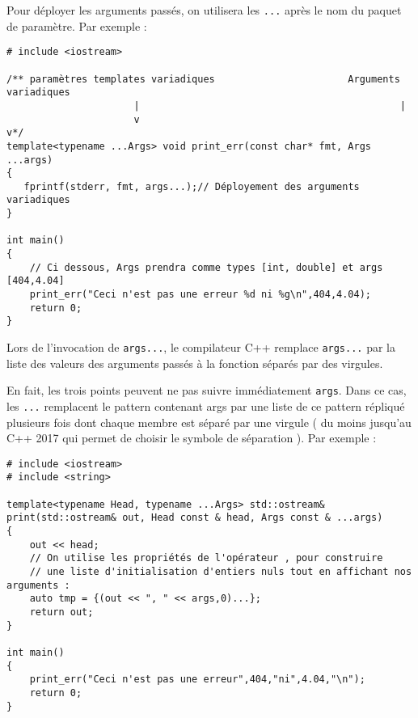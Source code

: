 \documentclass[a4]{article}
\begin{document}
Pour déployer les arguments passés, on utilisera les \verb$...$ après le nom du paquet de paramètre. Par exemple :

\begin{lstlisting}
# include <iostream>

/** paramètres templates variadiques                       Arguments variadiques
                      |                                             |
                      v                                             v*/
template<typename ...Args> void print_err(const char* fmt, Args ...args)
{
   fprintf(stderr, fmt, args...);// Déployement des arguments variadiques
}

int main()
{
    // Ci dessous, Args prendra comme types [int, double] et args [404,4.04]
    print_err("Ceci n'est pas une erreur %d ni %g\n",404,4.04);
    return 0;
}
\end{lstlisting}

Lors de l'invocation de \verb$args...$, le compilateur C++ remplace \verb$args...$ par la liste des valeurs des arguments passés
à la fonction séparés par des virgules.

En fait, les trois points peuvent ne pas suivre immédiatement \verb$args$. Dans ce cas, les \verb$...$ remplacent le pattern contenant
args par une liste de ce pattern répliqué plusieurs fois dont chaque membre est séparé par une virgule ( du moins jusqu'au C++ 2017 qui
permet de choisir le symbole de séparation ). Par exemple :

\begin{lstlisting}
# include <iostream>
# include <string>

template<typename Head, typename ...Args> std::ostream& 
print(std::ostream& out, Head const & head, Args const & ...args)
{
    out << head;
    // On utilise les propriétés de l'opérateur , pour construire
    // une liste d'initialisation d'entiers nuls tout en affichant nos arguments :
    auto tmp = {(out << ", " << args,0)...};
    return out;
}

int main()
{
    print_err("Ceci n'est pas une erreur",404,"ni",4.04,"\n");
    return 0;
}
\end{lstlisting}
\end{document}
